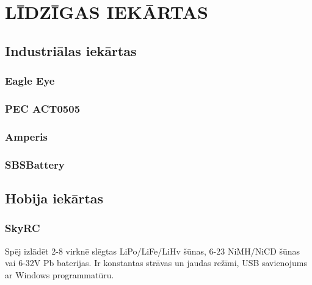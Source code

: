 \documentclass[12pt,fleqn,titlepage,oneside]{article}
\begin{document}
\FloatBarrier
\newpage
\section{\texorpdfstring{\MakeUppercase{Līdzīgas iekārtas}}{Līdzīgas iekārtas}}

\subsection{Industriālas iekārtas}

\subsubsection{Eagle Eye}

\subsubsection{PEC ACT0505} 

\subsubsection{Amperis}

\subsubsection{SBSBattery}

\subsection{Hobija iekārtas}

\subsubsection{SkyRC}

Spēj izlādēt 2-8 virknē slēgtas LiPo/LiFe/LiHv šūnas, 6-23 NiMH/NiCD šūnas vai 6-32V Pb baterijas.
Ir konstantas strāvas un jaudas režīmi, USB savienojums ar Windows programmatūru.
\end{document}
